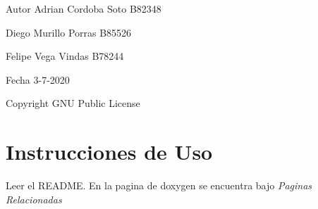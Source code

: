 \begin{DoxyAuthor}{Autor}
Adrian Cordoba Soto B82348 

Diego Murillo Porras B85526 

Felipe Vega Vindas B78244 
\end{DoxyAuthor}
\begin{DoxyDate}{Fecha}
3-\/7-\/2020
\end{DoxyDate}
\begin{DoxyCopyright}{Copyright}
G\+NU Public License
\end{DoxyCopyright}
\hypertarget{index_intro}{}\section{Instrucciones de Uso}\label{index_intro}
Leer el R\+E\+A\+D\+ME. En la pagina de doxygen se encuentra bajo {\itshape Paginas Relacionadas} 